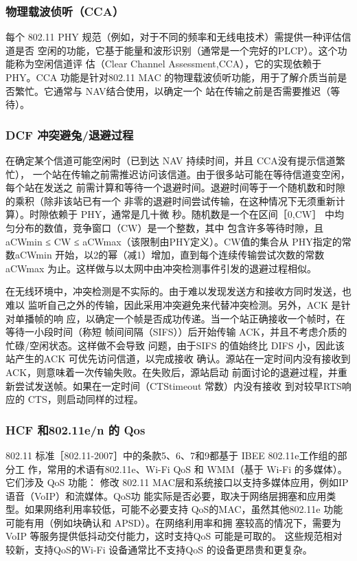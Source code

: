 \subsubsection{物理载波侦听（CCA）}

每个 802.11 PHY 规范（例如，对于不同的频率和无线电技术）需提供一种评估信道是否
空闲的功能，它基于能量和波形识别（通常是一个完好的PLCP）。这个功能称为空闲信道评
估（Clear Channel Assessment,CCA），它的实现依赖于 PHY。CCA 功能是针对802.11 MAC
的物理载波侦听功能，用于了解介质当前是否繁忙。它通常与 NAV结合使用，以确定一个
站在传输之前是否需要推迟（等待）。

\subsubsection{DCF 冲突避兔/退避过程}

在确定某个信道可能空闲时（已到达 NAV 持续时间，并且 CCA没有提示信道繁忙），
一个站在传输之前需推迟访问该信道。由于很多站可能在等待信道变空闲，每个站在发送之
前需计算和等待一个退避时间。退避时间等于一个随机数和时隙的乘积（除非该站已有一个
非零的退避时间尝试传输，在这种情况下无须重新计算）。时隙依赖于 PHY，通常是几十微
秒。随机数是一个在区间［0,CW］ 中均匀分布的数值，竞争窗口（CW）是一个整数，其中
包含许多等待时隙，且aCWmin ≤ CW ≤ aCWmax（该限制由PHY定义）。CW值的集合从
PHY指定的常数aCWmin 开始，以2的幂（减1）增加，直到每个连续传输尝试次数的常数
aCWmax 为止。这样做与以太网中由冲突检测事件引发的退避过程相似。

在无线环境中，冲突检测是不实际的。由于难以发现发送方和接收方同时发送，也难以
监听自己之外的传输，因此采用冲突避免来代替冲突检测。另外，ACK 是针对单播帧的响
应，以确定一个帧是否成功传递。当一个站正确接收一个帧时，在等待一小段时间（称短
帧间间隔（SIFS））后开始传输 ACK，并且不考虑介质的忙碌/空闲状态。这样做不会导致
问题，由于SIFS 的值始终比 DIFS 小，因此该站产生的ACK 可优先访问信道，以完成接收
确认。源站在一定时间内没有接收到ACK，则意味着一次传输失败。在失败后，源站启动
前面讨论的退避过程，并重新尝试发送帧。如果在一定时间（CTStimeout 常数）内没有接收
到对较早RTS响应的 CTS，则启动同样的过程。

\subsubsection{HCF 和802.11e/n 的 Qos}

802.11 标准［802.11-2007］中的条款5、6、7和9都基于 IBEE 802.11e工作组的部分工
作，常用的术语有802.11e、Wi-Fi QoS 和 WMM（基于 Wi-Fi 的多媒体）。它们涉及 QoS 功能：
修改 802.11 MAC层和系统接口以支持多媒体应用，例如IP 语音（VoIP）和流媒体。QoS功
能实际是否必要，取决于网络层拥塞和应用类型。如果网络利用率较低，可能不必要支持
QoS的MAC，虽然其他802.11e 功能可能有用（例如块确认和 APSD）。在网络利用率和拥
塞较高的情况下，需要为VoIP 等服务提供低抖动交付能力，这时支持QoS 可能是可取的。
这些规范相对较新，支持QoS的Wi-Fi 设备通常比不支持QoS 的设备更昂贵和更复杂。

